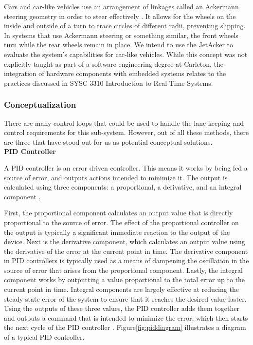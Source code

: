 \documentclass[titlepage, draft]{article}
\begin{document}
{Cars and car-like vehicles use an arrangement of linkages called an Ackermann steering geometry in order to steer effectively \cite{AckermannSteer}. It allows for the wheels on the inside and outside of a turn to trace circles of different radii, preventing slipping. In systems that use Ackermann steering or something similar, the front wheels turn while the rear wheels remain in place. We intend to use the JetAcker to evaluate the system’s capabilities for car-like vehicles. While this concept was not explicitly taught as part of a software engineering degree at Carleton, the integration of hardware components with embedded systems relates to the practices discussed in SYSC 3310 Introduction to Real-Time Systems.

\subsubsection{Conceptualization}
\label{KCConcept}

There are many control loops that could be used to handle the lane keeping and control requirements for this sub-system. However, out of all these methods, there are three that have stood out for us as potential conceptual solutions.
\\

\textbf{PID Controller}

A PID controller is an error driven controller. This means it works by being fed a source of error, and outputs actions intended to minimize it. The output is calculated using three components: a proportional, a derivative, and an integral component \cite{pid_explanation}.

First, the proportional component calculates an output value that is directly proportional to the source of error. The effect of the proportional controller on the output is typically a significant immediate reaction to the output of the device. Next is the derivative component, which calculates an output value using the derivative of the error at the current point in time. The derivative component in PID controllers is typically used as a means of dampening the oscillation in the source of error that arises from the proportional component. Lastly, the integral component works by outputting a value proportional to the total error up to the current point in time. Integral components are largely effective at reducing the steady state error of the system to ensure that it reaches the desired value faster.  Using the outputs of these three values, the PID controller adds them together and outputs a command that is intended to minimize the error, which then starts the next cycle of the PID controller \cite{pid_explanation}. Figure\ref{fig:piddiagram} illustrates a diagram of a typical PID controller.\\

}
\end{document}
